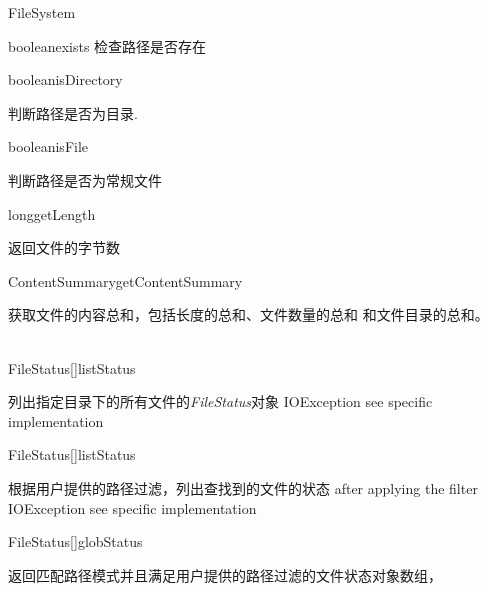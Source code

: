 \begin{XeClass}{FileSystem}
\begin{XeMethod}{\XePublic}{boolean}{exists}
 检查路径是否存在

    \end{XeMethod}

    \begin{XeMethod}{\XePublic}{boolean}{isDirectory}
         
 判断路径是否为目录.

    \end{XeMethod}

    \begin{XeMethod}{\XePublic}{boolean}{isFile}
         
 判断路径是否为常规文件

    \end{XeMethod}

    \begin{XeMethod}{\XePublic}{long}{getLength}
         
 返回文件的字节数

    \end{XeMethod}

    \begin{XeMethod}{\XePublic}{ContentSummary}{getContentSummary}
         
 获取文件的内容总和，包括长度的总和、文件数量的总和
 和文件目录的总和。

    \end{XeMethod}

    \begin{XeMethod}{\XePublic \\ \XeAbstract}{FileStatus[]}{listStatus}
         
 列出指定目录下的所有文件的\emph{FileStatus}对象
 IOException see specific implementation

    \end{XeMethod}

    \begin{XeMethod}{\XePublic}{FileStatus[]}{listStatus}
         
 根据用户提供的路径过滤，列出查找到的文件的状态
 after applying the filter
 IOException see specific implementation

    \end{XeMethod}

    \begin{XeMethod}{\XePublic}{FileStatus[]}{globStatus}
         
 返回匹配路径模式并且满足用户提供的路径过滤的文件状态对象数组，

    \end{XeMethod}


\end{XeClass}
